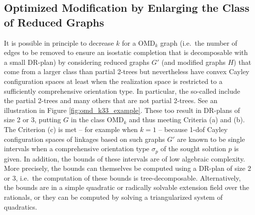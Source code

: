 \subsection{Optimized Modification by Enlarging the Class of Reduced
Graphs}
\label{sec:tdecomp}
%
It is possible in principle to decrease $k$ for a OMD$_k$ graph (i.e.\ the number of edges to be removed to ensure an isostatic completion that is decomposable with a small DR-plan) by considering reduced graphs $G'$ (and modified graphs $H$) that come from a larger class than partial 2-trees but nevertheless have convex Cayley configuration spaces at least when the realization space is restricted to a sufficiently comprehensive orientation type. In particular, the so-called  \cite{sitharam2011cayleyI,sitharam2011cayleyII} include the partial 2-trees and many others that are not partial 2-trees. See an illustration in Figure \ref{fig:omd_k33_example}. These too result in DR-plans of size 2 or 3, putting $G$ in the class OMD$_k$ and thus meeting Criteria (a) and (b). The Criterion (c) is met -- for example when $k=1$ -- because 1-dof Cayley configuration spaces of linkages based on such graphs $G'$ are known to be single intervals when a comprehensive orientation type $\sigma_p$ of the sought solution $p$ is given. In addition, the bounds of these intervals are of low algebraic complexity. More precisely, the bounds  can themselves be computed using a DR-plan of size 2 or 3, i.e.\ the computation of these bounds is tree-decomposable. Alternatively, the bounds are in a simple quadratic or radically solvable extension field over the rationals, or they can be computed by solving a triangularized system of quadratics.
